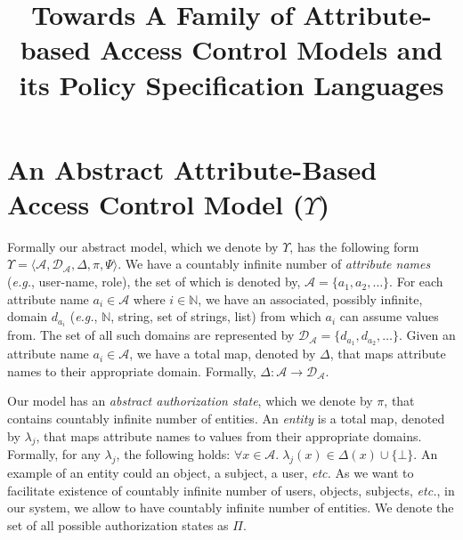 \documentclass{sig-alternate}
\title{Towards A Family of Attribute-based Access Control Models and its Policy Specification Languages}
\author{}
\date{}
\newcommand{\ie}{\textit{i.e.}\xspace}
\newcommand{\eg}{\textit{e.g.}\xspace}
\newcommand{\etc}{\textit{etc.}\xspace}
\newcommand{\state}{\ensuremath{\pi}\xspace}
\newcommand{\stateset}{\ensuremath{\Pi}\xspace}
\newcommand{\policyfunc}{\ensuremath{\Psi}\xspace}
\newcommand{\cD}{\ensuremath{\mathcal{D}}\xspace}
\newcommand{\cA}{\ensuremath{\mathcal{A}}\xspace}
\newcommand{\funcname}[1]{\textbf{\texttt{#1}}}
\newcommand{\dom}{\ensuremath{\Delta}\xspace} %
\newcommand{\domop}{\funcname{opDom}\xspace} %
\newcommand{\OP}{\ensuremath{\mathcal{OP}}\xspace}
\newcommand{\arity}{\ensuremath{\iota}\xspace}
\newcommand{\entity}{\ensuremath{\lambda}\xspace}
\newcommand{\op}{\ensuremath{\mu}\xspace}
\newcommand{\abac}{\ensuremath{\Upsilon}\xspace}
\begin{document}
\maketitle

\begin{abstract}

\end{abstract}



\section{An Abstract Attribute-Based Access Control Model (\abac)}
\label{sec:model}
Formally our abstract model, which we denote by \abac, has the following form 
$\abac=\langle\cA, \cD_{\cA}, \dom,  \state, \policyfunc\rangle$. 
We have a countably infinite number of \emph{attribute names} (\eg, user-name, role), the set of which is denoted by, $\cA=\{a_1, a_2,\ldots\}$.  
For each attribute name $a_i\in\cA$ where $i\in\mathbb{N}$, we have an associated, possibly infinite, domain $d_{a_i}$ (\eg, $\mathbb{N}$, 
string, set of strings, list) from which $a_i$ can assume values from. 
The set of all such domains are represented by $\cD_{\cA}=\{d_{a_1}, d_{a_2}, \ldots\}$.  Given an attribute 
name $a_i \in \cA$, we have a total map, denoted by \dom, that maps attribute names to their 
appropriate domain. Formally, $\dom: \cA \rightarrow \cD_{\cA}$. 


Our model has an \emph{abstract authorization state}, which we denote by \state, that contains countably infinite number of entities. 
An \emph{entity} is a total map, denoted by $\entity_j$, that maps attribute names to values from their appropriate domains.
Formally, for any $\entity_j$, the following holds: $\forall x \in \cA.\; \entity_j(x) \in \dom(x) \cup \{\bot\}$. 
An example of an entity could an object, a subject, a user, \etc As we want to facilitate existence of countably infinite number 
of users, objects, subjects, \etc, in our system, we allow to have countably infinite number of entities. 
We denote the set of all possible authorization states as \stateset. 
\end{document}
